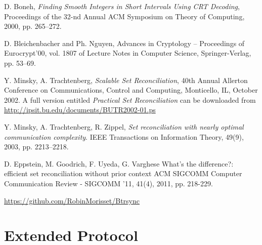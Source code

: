 \documentclass[11pt]{llncs}
\begin{document}
\nocite{rsync}
\nocite{wagner}




\begin{thebibliography}{30}

 D. Boneh, {\sl Finding Smooth Integers in Short Intervals Using CRT Decoding}, Proceedings of the 32-nd Annual ACM Symposium on Theory of Computing, 2000, pp. 265--272.

 D. Bleichenbacher and Ph. Nguyen, Advances in Cryptology -- Proceedings of Eurocrypt'00, vol. 1807 of Lecture Notes in Computer Science, Springer-Verlag, pp. 53--69.

 Y. Minsky, A. Trachtenberg, {\sl Scalable Set Reconciliation}, 40th Annual Allerton Conference on Communications, Control and Computing, Monticello, IL, October 2002. A full version entitled {\sl Practical Set Reconciliation} can be downloaded from \url{http://ipsit.bu.edu/documents/BUTR2002-01.ps}

 Y. Minsky, A. Trachtenberg, R. Zippel, {\sl Set reconciliation with nearly optimal communication complexity}. IEEE Transactions on Information Theory, 49(9), 2003, pp. 2213–2218.

 D. Eppstein, M. Goodrich, F. Uyeda, G. Varghese What's the difference?: efficient set reconciliation without prior context
ACM SIGCOMM Computer Communication Review - SIGCOMM '11, 41(4), 2011, pp. 218-229.

 \url{https://github.com/RobinMorisset/Btrsync}

\end{thebibliography}

\appendix

\section{Extended Protocol}
\label{sec:extended}
\end{document}

